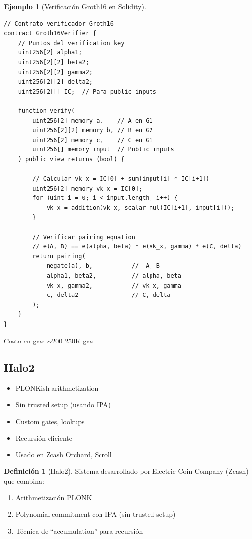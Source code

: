 \documentclass[11pt,a4paper,twoside,openright]{book}
\theoremstyle{definition}
\newtheorem{definition}{Definición}[chapter]
\newtheorem{example}{Ejemplo}[chapter]
\theoremstyle{plain}
\theoremstyle{remark}
\begin{document}
\begin{example}[Verificación Groth16 en Solidity]
\begin{verbatim}
// Contrato verificador Groth16
contract Groth16Verifier {
    // Puntos del verification key
    uint256[2] alpha1;
    uint256[2][2] beta2;
    uint256[2][2] gamma2;
    uint256[2][2] delta2;
    uint256[2][] IC;  // Para public inputs
    
    function verify(
        uint256[2] memory a,    // A en G1
        uint256[2][2] memory b, // B en G2
        uint256[2] memory c,    // C en G1
        uint256[] memory input  // Public inputs
    ) public view returns (bool) {
        
        // Calcular vk_x = IC[0] + sum(input[i] * IC[i+1])
        uint256[2] memory vk_x = IC[0];
        for (uint i = 0; i < input.length; i++) {
            vk_x = addition(vk_x, scalar_mul(IC[i+1], input[i]));
        }
        
        // Verificar pairing equation
        // e(A, B) == e(alpha, beta) * e(vk_x, gamma) * e(C, delta)
        return pairing(
            negate(a), b,           // -A, B
            alpha1, beta2,          // alpha, beta
            vk_x, gamma2,           // vk_x, gamma
            c, delta2               // C, delta
        );
    }
}
\end{verbatim}

Costo en gas: $\sim$200-250K gas.
\end{example}

\subsection{Halo2}

\begin{itemize}
    \item PLONKish arithmetization
    \item Sin trusted setup (usando IPA)
    \item Custom gates, lookups
    \item Recursión eficiente
    \item Usado en Zcash Orchard, Scroll
\end{itemize}

\begin{definition}[Halo2]
Sistema desarrollado por Electric Coin Company (Zcash) que combina:
\begin{enumerate}
    \item Arithmetización PLONK
    \item Polynomial commitment con IPA (sin trusted setup)
    \item Técnica de ``accumulation'' para recursión
\end{enumerate}
\end{definition}
\end{document}

